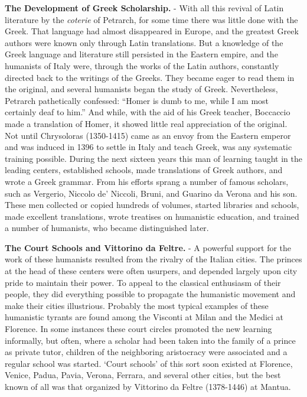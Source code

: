 \documentclass[]{book}
\begin{document}
\textbf{The Development of Greek Scholarship.} - With all this revival of Latin literature by the \emph{coterie} of Petrarch, for some time there was little done with the Greek. That language had almost disappeared in Europe, and the greatest Greek authors were known only through Latin translations. But a knowledge of the Greek language and literature still persisted in the Eastern empire, and the humanists of Italy were, through the works of the Latin authors, constantly directed back to the writings of the Greeks. They became eager to read them in the original, and several humanists began the study of Greek. Nevertheless, Petrarch pathetically confessed: ``Homer is dumb to me, while I am most certainly deaf to him.'' And while, with the aid of his Greek teacher, Boccaccio made a translation of Homer, it showed little real appreciation of the original. Not until Chrysoloras (1350-1415) came as an envoy from the Eastern emperor and was induced in 1396 to settle in Italy and teach Greek, was any systematic training possible. During the next sixteen years this man of learning taught in the leading centers, established schools, made translations of Greek authors, and wrote a Greek grammar. From his efforts sprang a number of famous scholars, such as Vergerio, Niccolo de' Niccoli, Bruni, and Guarino da Verona and his son. These men collected or copied hundreds of volumes, started libraries and schools, made excellent translations, wrote treatises on humanistic education, and trained a number of humanists, who became distinguished later.

\textbf{The Court Schools and Vittorino da Feltre.} - A powerful support for the work of these humanists resulted from the rivalry of the Italian cities. The princes at the head of these centers were often usurpers, and depended largely upon city pride to maintain their power. To appeal to the classical enthusiasm of their people, they did everything possible to propagate the humanistic movement and make their cities illustrious. Probably the most typical examples of these humanistic tyrants are found among the Visconti at Milan and the Medici at Florence. In some instances these court circles promoted the new learning informally, but often, where a scholar had been taken into the family of a prince as private tutor, children of the neighboring aristocracy were associated and a regular school was started. `Court schools' of this sort soon existed at Florence, Venice, Padua, Pavia, Verona, Ferrara, and several other cities, but the best known of all was that organized by Vittorino da Feltre (1378-1446) at Mantua.
\end{document}
